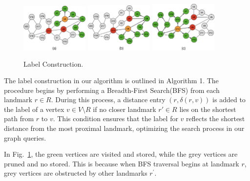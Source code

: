 \documentclass[sigconf]{acmart}
\begin{document}
%
%
\begin{figure}
\centering
\includegraphics[width=0.3\textwidth]{figures/4-1-a-label-con.png} 
\includegraphics[width=0.3\textwidth]{figures/4-1-b-label-con.png}
\includegraphics[width=0.3\textwidth]{figures/4-1-c-label-con.png}
\caption{Label Construction.} \label{fig4}
\end{figure}

The label construction in our algorithm is outlined in Algorithm 1. The procedure begins by performing a Breadth-First Search(BFS) from each landmark $r \in R$. During this process, a distance entry $(r, \delta(r, v))$ is added to the label of a vertex $v \in V \setminus R$ if no closer landmark $r' \in R$ lies on the shortest path from $r$ to $v$. This condition ensures that the label for $v$ reflects the shortest distance from the most proximal landmark, optimizing the search process in our graph queries. \par

In Fig.~\ref{fig4}, the green vertices are visited and stored, while the grey vertices are pruned and no stored. This is because when BFS traversal begins at landmark $r$, grey vertices are obstructed by other landmarks $r^{\prime}$.
\end{document}
